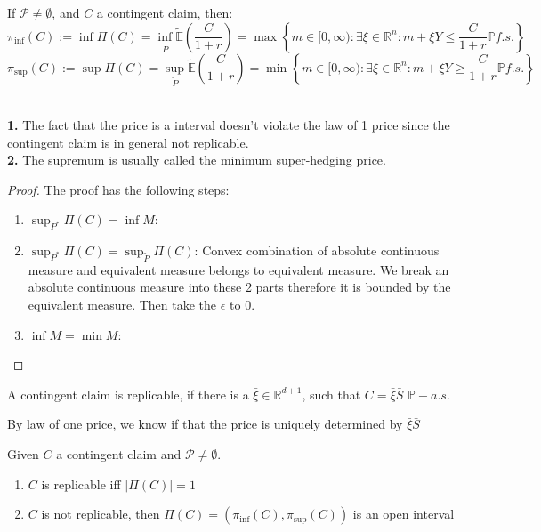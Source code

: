 \begin{theorem}
	If $\mathcal{P} \neq \emptyset$, and $C$ a contingent claim, then:
	\begin{equation*}
		\pi_{\inf}(C):= \inf \Pi(C) = \inf_{\tilde{P}}\tilde{\mathbb{E}}(\frac{C}{1+r}) = \max \left\{ m \in [0, \infty): \exists \xi \in \mathbb{R}^n:  m +   \xi Y \leq \frac{C}{1 + r} \mathbb{P} f.s. \right\}
	\end{equation*}
	\begin{equation*}
		\pi_{\sup}(C) := \sup \Pi(C) = \sup_{\tilde{P}}\tilde{\mathbb{E}}(\frac{C}{1+r}) = \min \left\{ m \in [0, \infty) : \exists \xi \in \mathbb{R}^n: m + \xi Y \geq \frac{C}{1 + r} \mathbb{P} f.s. \right\} 
	\end{equation*}
\end{theorem}
\begin{remark}\quad\\
\textbf{1.} The fact that the price is a interval doesn't violate the law of 1 price since the contingent claim is in general not replicable. \\
\textbf{2. }The supremum is usually called the minimum super-hedging price. 	
\end{remark}
\begin{proof}
	The proof has the following steps:
	\begin{enumerate}
		\item $\sup_{P^*}\Pi(C) = \inf M$:
		\item $\sup_{P^*}\Pi(C) = \sup_{\tilde{P}}\Pi(C)$: Convex combination of absolute continuous measure and equivalent measure belongs to equivalent measure. We break an absolute continuous measure into these 2 parts therefore it is bounded by the equivalent measure. Then take the $\epsilon$ to 0.  
		\item $\inf M = \min M$:
	\end{enumerate}
\end{proof}

\begin{definition}
A contingent claim is replicable, if there is a $\bar{\xi} \in \mathbb{R}^{d+1}$, such that $C = \bar{\xi} \bar{S}$ $\mathbb{P}-a.s.$
\end{definition}
\begin{remark}
By law of one price, we know if that the price is uniquely determined by $\bar{\xi} \bar{S}$	
\end{remark}

\begin{corollary}
	Given $C$ a contingent claim and $\mathcal{P} \neq \emptyset$.
	\begin{enumerate}
		\item $C$ is replicable iff $|\Pi(C)| = 1$
		\item $C$ is not replicable, then $\Pi(C) = (\pi_{\inf}(C), \pi_{\sup}(C))$ is an open interval
	\end{enumerate}
\end{corollary}




